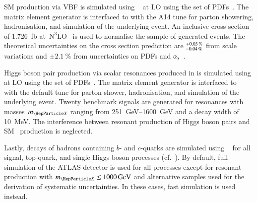 SM \HH production via VBF is simulated using
\MGNLO~\cite{Alwall:2014hca} %
at LO %
using the \NNPDF[3.0nlo] set of PDFs~\cite{Ball:2014uwa}. The matrix element
generator is interfaced to \PYTHIA[8] with the A14 tune for parton showering,
hadronisation, and simulation of the underlying event. An inclusive cross
section of \SI{1.726}{\femto\barn}
at~$\text{N}^3\text{LO}$~\cite{Dreyer:2018qbw,LHCHWGHH} is used to normalise the
sample of generated events. The theoretical uncertainties on the cross section
prediction are $^{\hspace{0.25pt}+\hspace{0.25pt}0.03\,\%}_{-0.04\,\%}$ from
scale variations and $\pm\SI{2.1}{\percent}$ from uncertainties on PDFs and
$\alpha_{\text{s}}$~\cite{LHCHWGHH}.

Higgs boson pair production via scalar resonances produced in \ggF is simulated
using \MGNLO at LO using the \NNPDF[2.3lo] set of PDFs~\cite{Ball:2012cx}. The
matrix element generator is interfaced to
\HERWIG[7.1]~\cite{Gieseke:2012ft,Bellm:2017jjp} with the default tune for
parton shower, hadronisation, and simulation of the underlying event. Twenty
benchmark signals are generated for resonances with masses~$\mX$ ranging from
\SIrange{251}{1600}{\GeV} and a decay width of \SI{10}{\MeV}.
The interference between resonant production of Higgs boson pairs and SM~\HH
production is neglected.

Lastly, decays of hadrons containing $b$- and $c$-quarks are simulated using
\EVTGEN~\cite{Lange:2001uf} for all signal, top-quark, and single Higgs boson
processes (cf.~). By default, full simulation of the ATLAS
detector is used for all processes except for resonant \HH production with
$\mX \leq \SI{1000}{\GeV}$ and alternative samples used for the derivation of
systematic uncertainties. In these cases, fast simulation is used instead.

